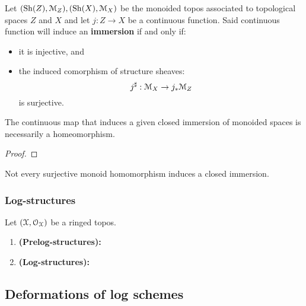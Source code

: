             \begin{definition}[Immersions] \label{def: immersions_of_monoided_spaces}
                Let $(\mathrm{Sh}(Z), \mathcal{M}_Z), (\mathrm{Sh}(X), \mathcal{M}_X)$ be the monoided topos associated to topological spaces $Z$ and $X$ and let $j: Z \to X$ be a continuous function. Said continuous function will induce an \textbf{immersion} if and only if:
                    \begin{itemize}
                        \item it is injective, and 
                        \item the induced comorphism of structure sheaves:
                            $$j^{\sharp}: \mathcal{M}_X \to j_*\mathcal{M}_Z$$
                        is surjective.
                    \end{itemize}
            \end{definition}
            \begin{proposition} \label{prop: closed_immersions_of_monoided_spaces_are_bijective}
                The continuous map that induces a given closed immersion of monoided spaces is necessarily a homeomorphism.  
            \end{proposition}
                \begin{proof}
                                
                \end{proof}
            \begin{corollary}
                Not every surjective monoid homomorphism induces a closed immersion.
            \end{corollary}
            
        \subsubsection{Log-structures}
            \begin{definition} \label{def: log_structures}
                Let $(\mathcal{X}, \mathcal{O}_{\mathcal{X}})$ be a ringed topos.
                \begin{enumerate}
                    \item \textbf{(Prelog-structures):}
                    \item \textbf{(Log-structures):}
                \end{enumerate}
            \end{definition}
    
    \subsection{Deformations of log schemes}